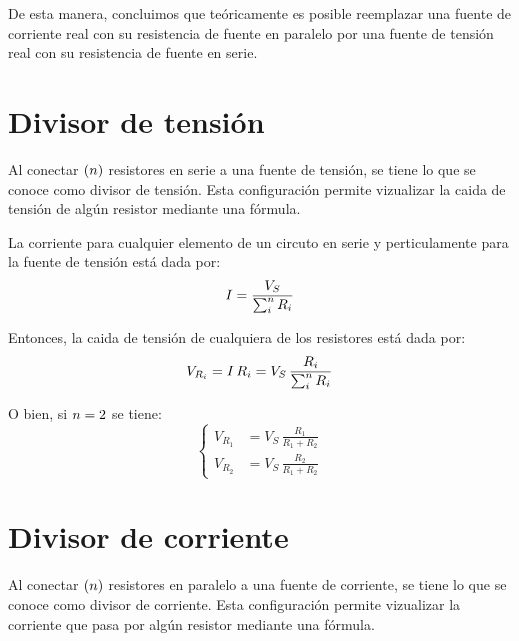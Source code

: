 \documentclass[a5paper,12pt,twoside]{book}
\begin{document}
De esta manera, concluimos que teóricamente es posible reemplazar una fuente de corriente real con su resistencia de fuente en paralelo por una fuente de tensión real con su resistencia de fuente en serie.


\section{Divisor de tensión}

Al conectar $(n)$ resistores en serie a una fuente de tensión, se tiene lo que se conoce como divisor de tensión.
Esta configuración permite vizualizar la caida de tensión de algún resistor mediante una fórmula.

\begin{center}
    \def\svgwidth{0.5\linewidth}
    
\end{center}

La corriente para cualquier elemento de un circuto en serie y perticulamente para la fuente de tensión está dada por:
\begin{equation*}
    I = \frac{V_S}{\sum_i^n R_i}
\end{equation*}

Entonces, la caida de tensión de cualquiera de los resistores está dada por:
\begin{equation*}
    V_{R_i} = I \, R_i = V_S \, \frac{R_i}{\sum_i^n R_i}
\end{equation*}

O bien, si $n=2$ se tiene:
\begin{equation*}
    \left\{
    \begin{aligned}
        V_{R_1} &= V_S \, \frac{R_1}{R_1 + R_2}
        \\[1ex]
        V_{R_2} &= V_S \, \frac{R_2}{R_1 + R_2}
    \end{aligned}
    \right.
\end{equation*}


\section{Divisor de corriente}

Al conectar $(n)$ resistores en paralelo a una fuente de corriente, se tiene lo que se conoce como divisor de corriente.
Esta configuración permite vizualizar la corriente que pasa por algún resistor mediante una fórmula.

\begin{center}
    \def\svgwidth{0.5\linewidth}
    
\end{center}
\end{document}
